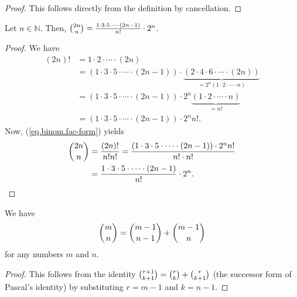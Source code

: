 \begin{proof}
\leanok
This follows directly from the definition by cancellation.
\end{proof}

\begin{lemma}
\label{lem.binom.2n-choose-n}
\leanhelper
\leanok
Let $n\in\mathbb{N}$. Then, $\dbinom{2n}{n}=\dfrac{1\cdot3\cdot5\cdot\cdots\cdot\left(  2n-1\right)  }{n!}\cdot2^{n}$.
\end{lemma}

\begin{proof}
\leanok
We have%
\begin{align*}
\left(  2n\right)  !  &  =1\cdot2\cdot\cdots\cdot\left(  2n\right) \\
&  =\left(  1\cdot3\cdot5\cdot\cdots\cdot\left(  2n-1\right)  \right)
\cdot\underbrace{\left(  2\cdot4\cdot6\cdot\cdots\cdot\left(  2n\right)
\right)  }_{=2^{n}\left(  1\cdot2\cdot
\cdots\cdot n\right)  }\\
&  =\left(  1\cdot3\cdot5\cdot\cdots\cdot\left(  2n-1\right)  \right)
\cdot2^{n}\underbrace{\left(  1\cdot2\cdot\cdots\cdot n\right)  }_{=n!}\\
&  =\left(  1\cdot3\cdot5\cdot\cdots\cdot\left(  2n-1\right)  \right)
\cdot2^{n}n!.
\end{align*}
Now, (\ref{eq.binom.fac-form}) yields%
\begin{align*}
\dbinom{2n}{n}  &  =\dfrac{\left(  2n\right)  !}{n!n!}=\dfrac{\left(  1\cdot3\cdot5\cdot
\cdots\cdot\left(  2n-1\right)  \right)  \cdot2^{n}n!}{n!\cdot n!}\\
&  =\dfrac{1\cdot3\cdot5\cdot\cdots\cdot\left(  2n-1\right)  }{n!}\cdot2^{n}.
\end{align*}
\end{proof}

\begin{proposition}
\label{prop.binom.rec}
\leantarget
\leanok
We have%
\begin{equation}
\dbinom{m}{n}=\dbinom{m-1}{n-1}+\dbinom{m-1}{n} \label{eq.binom.rec.m}%
\end{equation}
for any numbers $m$ and $n$.
\end{proposition}

\begin{proof}
\leanok
This follows from the identity
$\dbinom{r+1}{k+1} = \dbinom{r}{k} + \dbinom{r}{k+1}$
(the successor form of Pascal's identity)
by substituting $r = m - 1$ and $k = n - 1$.
\end{proof}

